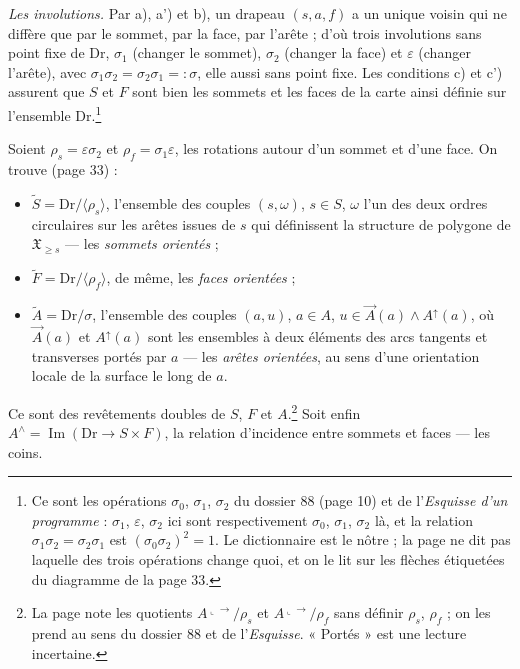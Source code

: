 \documentclass[11pt,a4paper]{article}
\begin{document}
\emph{Les involutions.} Par a), a') et b), un drapeau $(s, a, f)$ a un unique
voisin qui ne diffère que par le sommet, par la face, par l'arête ; d'où trois
involutions sans point fixe de $\mathrm{Dr}$, $\sigma_{1}$ (changer le sommet),
$\sigma_{2}$ (changer la face) et $\varepsilon$ (changer l'arête), avec
$\sigma_{1}\sigma_{2} = \sigma_{2}\sigma_{1} =: \sigma$, elle aussi sans point
fixe. Les conditions c) et c') assurent que $S$ et $F$ sont bien les sommets et
les faces de la carte ainsi définie sur l'ensemble $\mathrm{Dr}$.\footnote{Ce
sont les opérations $\sigma_{0}$, $\sigma_{1}$, $\sigma_{2}$ du dossier 88
(page 10) et de l'\emph{Esquisse d'un programme} : $\sigma_{1}$, $\varepsilon$,
$\sigma_{2}$ ici sont respectivement $\sigma_{0}$, $\sigma_{1}$, $\sigma_{2}$
là, et la relation $\sigma_{1}\sigma_{2} = \sigma_{2}\sigma_{1}$ est
$(\sigma_{0}\sigma_{2})^{2} = 1$. Le dictionnaire est le nôtre ; la page ne dit
pas laquelle des trois opérations change quoi, et on le lit sur les flèches
étiquetées du diagramme de la page 33.}

Soient $\rho_{s} = \varepsilon\sigma_{2}$ et $\rho_{f} = \sigma_{1}\varepsilon$,
les rotations autour d'un sommet et d'une face. On trouve (page 33) :
\begin{itemize}
\item $\widetilde{S} = \mathrm{Dr}/\langle\rho_{s}\rangle$, l'ensemble des
couples $(s, \omega)$, $s \in S$, $\omega$ l'un des deux ordres circulaires sur
les arêtes issues de $s$ qui définissent la structure de polygone de
$\mathfrak{X}_{\geq s}$ --- les \emph{sommets orientés} ;
\item $\widetilde{F} = \mathrm{Dr}/\langle\rho_{f}\rangle$, de même, les
\emph{faces orientées} ;
\item $\widetilde{A} = \mathrm{Dr}/\sigma$, l'ensemble des couples $(a, u)$,
$a \in A$, $u \in \vec{A}(a) \wedge A^{\uparrow}(a)$, où $\vec{A}(a)$ et
$A^{\uparrow}(a)$ sont les ensembles à deux éléments des arcs tangents et
transverses portés par $a$ --- les \emph{arêtes orientées}, au sens d'une
orientation locale de la surface le long de $a$.
\end{itemize}
Ce sont des revêtements doubles de $S$, $F$ et $A$.\footnote{La page note les quotients $A^{\llcorner\!\to}/\rho_{s}$ et
$A^{\llcorner\!\to}/\rho_{f}$ sans définir $\rho_{s}$, $\rho_{f}$ ; on les prend au
sens du dossier 88 et de l'\emph{Esquisse}. « Portés » est une lecture
incertaine.} Soit enfin $A^{\wedge} = \operatorname{Im}(\mathrm{Dr} \to S \times
F)$, la relation d'incidence entre sommets et faces --- les coins.
\end{document}

